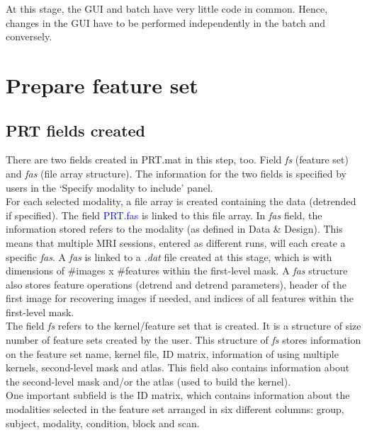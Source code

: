At this stage, the GUI and batch have very little code in common. Hence, changes in the GUI have to be performed independently in the batch and conversely.  






\section{Prepare feature set}

\subsection{PRT fields created}

There are two fields created in PRT.mat in this step, too. Field \textit{fs} (feature set) and \textit{fas} (file array structure). The information for the two fields is specified by users in the `Specify modality to include' panel.
\\


For each selected modality, a file array is created containing the data (detrended if specified). The field \textcolor{blue}{PRT.fas} is linked to this file array. In \textit{fas} field, the information stored refers to the modality (as defined in Data \& Design). This means that multiple MRI sessions, entered as different runs, will each create a specific \textit{fas}. A \textit{fas} is linked to a \textit{.dat} file created at this stage, which is with dimensions of \#images x \#features within the first-level mask. A \textit{fas} structure also stores feature operations (detrend and detrend parameters), header of the first image for recovering images if needed, and indices of all features within the first-level mask. \\

The field \textit{fs} refers to the kernel/feature set that is created. It is a structure of size number of feature sets created by the user. This structure of \textit{fs} stores information on the feature set name, kernel file, ID matrix, information of using multiple kernels, second-level mask and atlas. This field also contains information about the second-level mask and/or the atlas (used to build the kernel).
\\

One important subfield is the ID matrix, which contains information about the modalities selected in the feature set arranged in six different columns: group, subject, modality, condition, block and scan.

